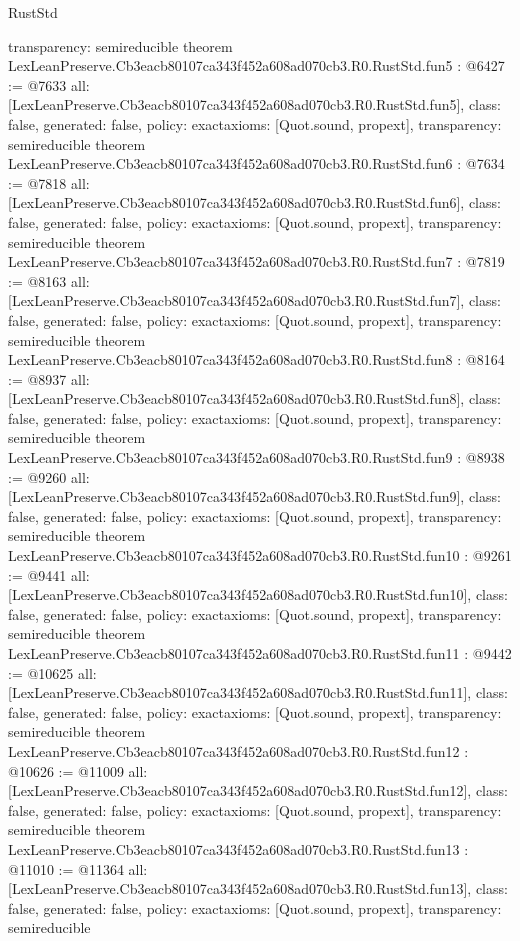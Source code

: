 \begin{lexlean}{RustStd}
\begin{coremodule}
{  transparency: semireducible
}
theorem LexLeanPreserve.Cb3eacb80107ca343f452a608ad070cb3.R0.RustStd.fun5 : @6427 := @7633 {
  all: [LexLeanPreserve.Cb3eacb80107ca343f452a608ad070cb3.R0.RustStd.fun5],
  class: false,
  generated: false,
  policy: exact{axioms: [Quot.sound, propext]},
  transparency: semireducible
}
theorem LexLeanPreserve.Cb3eacb80107ca343f452a608ad070cb3.R0.RustStd.fun6 : @7634 := @7818 {
  all: [LexLeanPreserve.Cb3eacb80107ca343f452a608ad070cb3.R0.RustStd.fun6],
  class: false,
  generated: false,
  policy: exact{axioms: [Quot.sound, propext]},
  transparency: semireducible
}
theorem LexLeanPreserve.Cb3eacb80107ca343f452a608ad070cb3.R0.RustStd.fun7 : @7819 := @8163 {
  all: [LexLeanPreserve.Cb3eacb80107ca343f452a608ad070cb3.R0.RustStd.fun7],
  class: false,
  generated: false,
  policy: exact{axioms: [Quot.sound, propext]},
  transparency: semireducible
}
theorem LexLeanPreserve.Cb3eacb80107ca343f452a608ad070cb3.R0.RustStd.fun8 : @8164 := @8937 {
  all: [LexLeanPreserve.Cb3eacb80107ca343f452a608ad070cb3.R0.RustStd.fun8],
  class: false,
  generated: false,
  policy: exact{axioms: [Quot.sound, propext]},
  transparency: semireducible
}
theorem LexLeanPreserve.Cb3eacb80107ca343f452a608ad070cb3.R0.RustStd.fun9 : @8938 := @9260 {
  all: [LexLeanPreserve.Cb3eacb80107ca343f452a608ad070cb3.R0.RustStd.fun9],
  class: false,
  generated: false,
  policy: exact{axioms: [Quot.sound, propext]},
  transparency: semireducible
}
theorem LexLeanPreserve.Cb3eacb80107ca343f452a608ad070cb3.R0.RustStd.fun10 : @9261 := @9441 {
  all: [LexLeanPreserve.Cb3eacb80107ca343f452a608ad070cb3.R0.RustStd.fun10],
  class: false,
  generated: false,
  policy: exact{axioms: [Quot.sound, propext]},
  transparency: semireducible
}
theorem LexLeanPreserve.Cb3eacb80107ca343f452a608ad070cb3.R0.RustStd.fun11 : @9442 := @10625 {
  all: [LexLeanPreserve.Cb3eacb80107ca343f452a608ad070cb3.R0.RustStd.fun11],
  class: false,
  generated: false,
  policy: exact{axioms: [Quot.sound, propext]},
  transparency: semireducible
}
theorem LexLeanPreserve.Cb3eacb80107ca343f452a608ad070cb3.R0.RustStd.fun12 : @10626 := @11009 {
  all: [LexLeanPreserve.Cb3eacb80107ca343f452a608ad070cb3.R0.RustStd.fun12],
  class: false,
  generated: false,
  policy: exact{axioms: [Quot.sound, propext]},
  transparency: semireducible
}
theorem LexLeanPreserve.Cb3eacb80107ca343f452a608ad070cb3.R0.RustStd.fun13 : @11010 := @11364 {
  all: [LexLeanPreserve.Cb3eacb80107ca343f452a608ad070cb3.R0.RustStd.fun13],
  class: false,
  generated: false,
  policy: exact{axioms: [Quot.sound, propext]},
  transparency: semireducible
}
\end{coremodule}
\end{lexlean}

